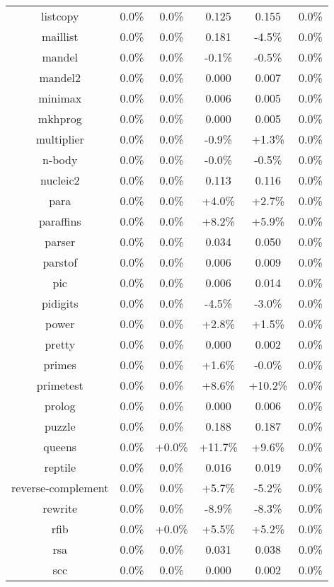 \begin{tabular}{ c c c c c c }
listcopy &  0.0\% &  0.0\% & 0.125 & 0.155 &  0.0\%\\
maillist &  0.0\% &  0.0\% & 0.181 & -4.5\% &  0.0\%\\
mandel &  0.0\% &  0.0\% & -0.1\% & -0.5\% &  0.0\%\\
mandel2 &  0.0\% &  0.0\% & 0.000 & 0.007 &  0.0\%\\
minimax &  0.0\% &  0.0\% & 0.006 & 0.005 &  0.0\%\\
mkhprog &  0.0\% &  0.0\% & 0.000 & 0.005 &  0.0\%\\
multiplier &  0.0\% &  0.0\% & -0.9\% & +1.3\% &  0.0\%\\
n-body &  0.0\% &  0.0\% & -0.0\% & -0.5\% &  0.0\%\\
nucleic2 &  0.0\% &  0.0\% & 0.113 & 0.116 &  0.0\%\\
para &  0.0\% &  0.0\% & +4.0\% & +2.7\% &  0.0\%\\
paraffins &  0.0\% &  0.0\% & +8.2\% & +5.9\% &  0.0\%\\
parser &  0.0\% &  0.0\% & 0.034 & 0.050 &  0.0\%\\
parstof &  0.0\% &  0.0\% & 0.006 & 0.009 &  0.0\%\\
pic &  0.0\% &  0.0\% & 0.006 & 0.014 &  0.0\%\\
pidigits &  0.0\% &  0.0\% & -4.5\% & -3.0\% &  0.0\%\\
power &  0.0\% &  0.0\% & +2.8\% & +1.5\% &  0.0\%\\
pretty &  0.0\% &  0.0\% & 0.000 & 0.002 &  0.0\%\\
primes &  0.0\% &  0.0\% & +1.6\% & -0.0\% &  0.0\%\\
primetest &  0.0\% &  0.0\% & +8.6\% & +10.2\% &  0.0\%\\
prolog &  0.0\% &  0.0\% & 0.000 & 0.006 &  0.0\%\\
puzzle &  0.0\% &  0.0\% & 0.188 & 0.187 &  0.0\%\\
queens &  0.0\% & +0.0\% & +11.7\% & +9.6\% &  0.0\%\\
reptile &  0.0\% &  0.0\% & 0.016 & 0.019 &  0.0\%\\
reverse-complement &  0.0\% &  0.0\% & +5.7\% & -5.2\% &  0.0\%\\
rewrite &  0.0\% &  0.0\% & -8.9\% & -8.3\% &  0.0\%\\
rfib &  0.0\% & +0.0\% & +5.5\% & +5.2\% &  0.0\%\\
rsa &  0.0\% &  0.0\% & 0.031 & 0.038 &  0.0\%\\
scc &  0.0\% &  0.0\% & 0.000 & 0.002 &  0.0\%\\

\end{tabular}
